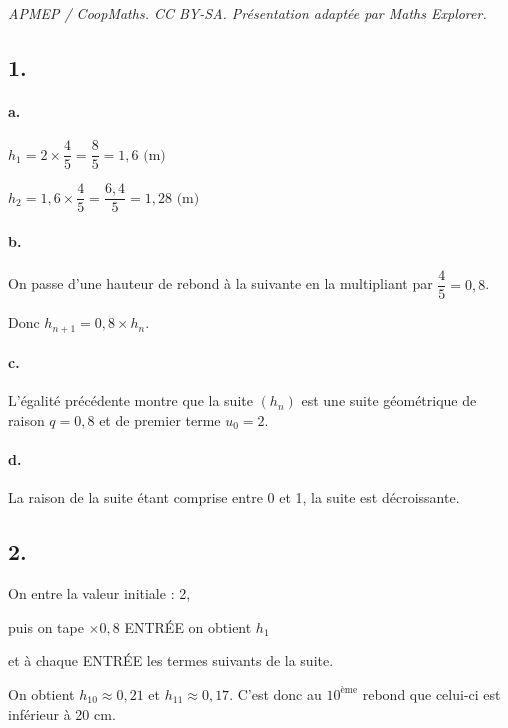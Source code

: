 \documentclass[10pt]{article}
\begin{document}
\noindent\textit{APMEP / CoopMaths. CC BY-SA. Présentation adaptée par Maths Explorer.}\par\medskip
\subsection*{1.}

\paragraph{a.} 
\(h_1 = 2 \times \dfrac{4}{5} = \dfrac{8}{5} = 1{,}6 \text{ (m)}\)

\(h_2 = 1{,}6 \times \dfrac{4}{5} = \dfrac{6,4}{5} = 1{,}28 \text{ (m)}\)

\paragraph{b.} On passe d'une hauteur de rebond à la suivante en la multipliant par \(\dfrac{4}{5} = 0{,}8\).

Donc \(h_{n+1} = 0{,}8 \times h_n\).

\paragraph{c.} L'égalité précédente montre que la suite \((h_n)\) est une suite géométrique de raison \(q = 0{,}8\) et de premier terme \(u_0 = 2\).

\paragraph{d.} La raison de la suite étant comprise entre 0 et 1, la suite est décroissante.

\subsection*{2.}

On entre la valeur initiale : 2,

puis on tape \(\times 0{,}8\) ENTRÉE on obtient \(h_1\)

et à chaque ENTRÉE les termes suivants de la suite.

On obtient \(h_{10} \approx 0{,}21\) et \(h_{11} \approx 0{,}17\). C'est donc au \(10^{\text{ème}}\) rebond que celui-ci est inférieur à 20 cm.
\end{document}
